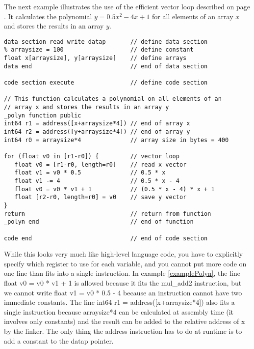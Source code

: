 \documentclass[forwardcom.tex]{subfiles}
\begin{document}
The next example illustrates the use of the efficient vector loop described on page \pageref{vectorLoops}. 
It calculates the polynomial $y = 0.5 x^2 - 4 x + 1$ for all elements of an array $x$
and stores the results in an array $y$.

\begin{example}
\label{examplePolyn}
\end{example} %
\begin{lstlisting}[frame=single]
data section read write datap       // define data section
% arraysize = 100                   // define constant
float x[arraysize], y[arraysize]    // define arrays
data end                            // end of data section

code section execute                // define code section

// This function calculates a polynomial on all elements of an
// array x and stores the results in an array y
_polyn function public
int64 r1 = address([x+arraysize*4]) // end of array x
int64 r2 = address([y+arraysize*4]) // end of array y
int64 r0 = arraysize*4              // array size in bytes = 400

for (float v0 in [r1-r0]) {         // vector loop
   float v0 = [r1-r0, length=r0]    // read x vector
   float v1 = v0 * 0.5              // 0.5 * x
   float v1 -= 4                    // 0.5 * x - 4
   float v0 = v0 * v1 + 1           // (0.5 * x - 4) * x + 1
   float [r2-r0, length=r0] = v0    // save y vector
}
return                              // return from function
_polyn end                          // end of function

code end                            // end of code section
\end{lstlisting}
\vspace{2mm}

While this looks very much like high-level language code, you have to explicitly specify which register to use for each variable, and you cannot put more code on one line than fits into a single instruction.
In example \ref{examplePolyn}, the line {\ttfamily float v0 = v0 * v1 + 1 } is allowed because it fits the {\ttfamily mul\_add2} instruction, but we cannot write {\ttfamily float v1 = v0 * 0.5 - 4 } because an instruction cannot have two immediate constants.
The line {\ttfamily int64 r1 = address([x+arraysize*4])} also fits a single instruction because 
{\ttfamily arraysize*4} can be calculated at assembly time (it involves only constants) and the result can be added to the relative address of {\ttfamily x} by the linker. The only thing the {\ttfamily address} instruction has to do at runtime is to add a constant to the {\ttfamily datap} pointer.
\vspace{2mm}
\end{document}
